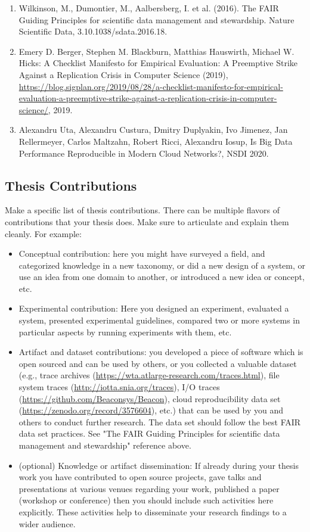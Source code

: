 \documentclass[11pt]{article}
\begin{document}
\begin{enumerate}
    \item Wilkinson, M., Dumontier, M., Aalbersberg, I. et al. (2016). The FAIR Guiding Principles for scientific data management and stewardship. Nature Scientific Data, 3.10.1038/sdata.2016.18. 
    \item Emery D. Berger, Stephen M. Blackburn, Matthias Hauswirth, Michael W. Hicks: A Checklist Manifesto for Empirical Evaluation: A Preemptive Strike Against a Replication Crisis in Computer Science (2019),  \url{https://blog.sigplan.org/2019/08/28/a-checklist-manifesto-for-empirical-evaluation-a-preemptive-strike-against-a-replication-crisis-in-computer-science/}, 2019. 
    \item Alexandru Uta, Alexandru Custura, Dmitry Duplyakin, Ivo Jimenez, Jan Rellermeyer, Carlos Maltzahn, Robert Ricci, Alexandru Iosup, Is Big Data Performance Reproducible in Modern Cloud Networks?, NSDI 2020. 
\end{enumerate}


\subsection{Thesis Contributions}
Make a specific list of thesis contributions. There can be multiple flavors of contributions that your thesis does. Make sure to articulate and explain them cleanly. For example: 
\begin{itemize}
    \item Conceptual contribution: here you might have surveyed a field, and categorized knowledge in a new taxonomy, or did a new design of a system, or use an idea from one domain to another, or introduced a new idea or concept, etc. 
    \item Experimental contribution: Here you designed an experiment, evaluated a system, presented experimental guidelines, compared two or more systems in particular aspects by running experiments with them, etc. 
    \item Artifact and dataset contributions: you developed a piece of software which is open sourced and can be used by others, or you collected a valuable dataset (e.g., trace archives (\url{https://wta.atlarge-research.com/traces.html}), file system traces (\url{http://iotta.snia.org/traces}), I/O traces (\url{https://github.com/Beaconsys/Beacon}), cloud reproducibility data set  (\url{https://zenodo.org/record/3576604}), etc.) that can be used by you and others to conduct further research. The data set should follow the best FAIR data set practices. See "The FAIR Guiding Principles for scientific data management and stewardship" reference above. 
    \item (optional) Knowledge or artifact dissemination: If already during your thesis work you have contributed to open source projects, gave talks and presentations at various venues regarding your work, published a paper (workshop or conference) then you should include such activities here explicitly. These activities help to disseminate your research findings to a wider audience.
\end{itemize}
\end{document}
